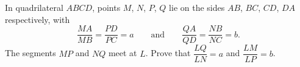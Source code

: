 In quadrilateral $ABCD$, points $M$, $N$, $P$, $Q$ lie on the sides $AB$, $BC$, $CD$, $DA$ respectively, with
\[
\dfrac{MA}{MB}=\dfrac{PD}{PC}=a\qquad\text{and}\qquad\dfrac{QA}{QD}=\dfrac{NB}{NC}=b .
\]
The segments $MP$ and $NQ$ meet at $L$. Prove that $\dfrac{LQ}{LN}=a$ and $\dfrac{LM}{LP}=b$.
